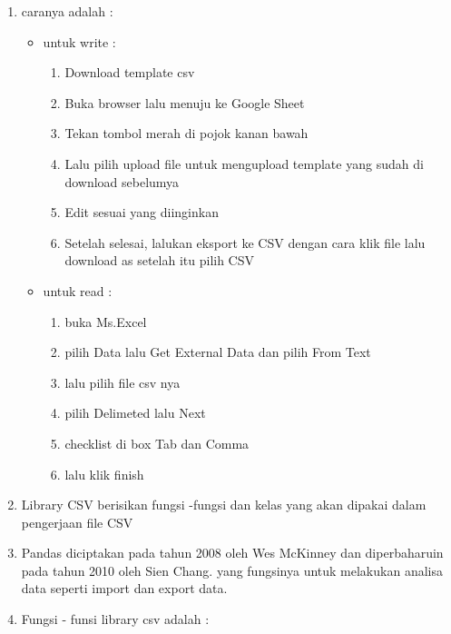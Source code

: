 \begin{enumerate}
	\item caranya adalah :
		\begin{itemize}
			\item untuk write :
			\begin{enumerate}
				\item Download template csv
				\item Buka browser lalu menuju ke Google Sheet
				\item Tekan tombol merah di pojok kanan bawah
				\item Lalu pilih upload file untuk mengupload template yang sudah di download sebelumya
				\item Edit sesuai yang diinginkan
				\item Setelah selesai, lalukan eksport ke CSV dengan cara klik file lalu download as setelah itu pilih CSV
			\end{enumerate}
			\item untuk read :
			\begin{enumerate}
				\item buka Ms.Excel
				\item pilih Data lalu Get External Data dan pilih From Text
				\item lalu pilih file csv nya
				\item pilih Delimeted lalu Next
				\item checklist di box Tab dan Comma
				\item lalu klik finish
			\end{enumerate}
		\end{itemize}	
	\item Library CSV berisikan fungsi -fungsi dan kelas yang akan dipakai dalam pengerjaan file CSV

	\item Pandas diciptakan pada tahun 2008 oleh Wes McKinney dan diperbaharuin pada tahun 2010 oleh Sien Chang. yang fungsinya untuk melakukan analisa data seperti import dan export data.

	\item Fungsi - funsi library csv adalah :
		\begin{itemize}
			

\end{itemize}
\end{enumerate}
